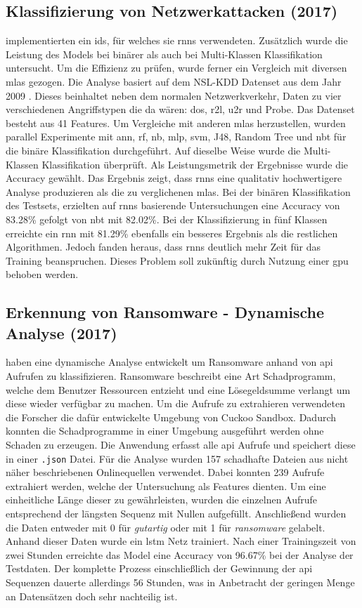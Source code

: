 \documentclass[
    12pt, %
    DIV10,
    ngerman, %
    a4paper, %
    oneside, %
    titlepage, %
    parskip=half, %
    headings=normal, %
    listof=totoc, %
    bibliography=totoc, %
    index=totoc, %
    captions=tableheading, %
    final %
]{scrreprt}
\begin{document}
\subsection{Klassifizierung von Netzwerkattacken (2017)}\label{yin}
\textcite{Yin2017} implementierten ein \ac{ids}, für welches sie \ac{rnns} verwendeten. Zusätzlich wurde die Leistung des Models bei binärer als auch bei Multi-Klassen Klassifikation untersucht. Um die Effizienz zu prüfen, wurde ferner ein Vergleich mit diversen \ac{mlas} gezogen. Die Analyse basiert auf dem NSL-KDD Datenset aus dem Jahr 2009 \parencite{Cybersecurity}. Dieses beinhaltet neben dem normalen Netzwerkverkehr, Daten zu vier verschiedenen Angriffstypen die da wären: \ac{dos}, \ac{r2l}, \ac{u2r} und Probe. Das Datenset besteht aus 41 Features. Um Vergleiche mit anderen \ac{mlas} herzustellen, wurden parallel Experimente mit \ac{ann}, \ac{rf}, \ac{nb}, \ac{mlp}, \ac{svm}, J48, Random Tree und \ac{nbt} für die binäre Klassifikation durchgeführt. Auf dieselbe Weise wurde die Multi-Klassen Klassifikation überprüft. Als Leistungsmetrik der Ergebnisse wurde die Accuracy gewählt. Das Ergebnis zeigt, dass \ac{rnns} eine qualitativ hochwertigere Analyse produzieren als die zu verglichenen \ac{mlas}. Bei der binären Klassifikation des Testsets, erzielten auf \ac{rnns} basierende Untersuchungen eine Accuracy von 83.28\% gefolgt von \ac{nbt} mit 82.02\%. Bei der Klassifizierung in fünf Klassen erreichte ein \ac{rnn} mit 81.29\% ebenfalls ein besseres Ergebnis als die restlichen Algorithmen. Jedoch fanden \textcite{Yin2017} heraus, dass \ac{rnns} deutlich mehr Zeit für das Training beanspruchen. Dieses Problem soll zukünftig durch Nutzung einer \ac{gpu} behoben werden.
%
\subsection{Erkennung von Ransomware - Dynamische Analyse (2017)}
\textcite{Maniath2018} haben eine dynamische Analyse entwickelt um Ransomware anhand von \ac{api} Aufrufen zu klassifizieren. Ransomware beschreibt eine Art Schadprogramm, welche dem Benutzer Ressourcen entzieht und eine Lösegeldsumme verlangt um diese wieder verfügbar zu machen. Um die Aufrufe zu extrahieren verwendeten die Forscher die dafür entwickelte Umgebung von Cuckoo Sandbox. Dadurch konnten die Schadprogramme in einer Umgebung ausgeführt werden ohne Schaden zu erzeugen. Die Anwendung erfasst alle \ac{api} Aufrufe und speichert diese in einer \texttt{.json} Datei. Für die Analyse wurden 157 schadhafte Dateien aus nicht näher beschriebenen Onlinequellen verwendet. Dabei konnten 239 Aufrufe extrahiert werden, welche der Untersuchung als Features dienten. Um eine einheitliche Länge dieser zu gewährleisten, wurden die einzelnen Aufrufe entsprechend der längsten Sequenz mit Nullen aufgefüllt. Anschlie{\ss}end wurden die Daten entweder mit 0 für \emph{gutartig} oder mit 1 für \emph{ransomware} gelabelt. Anhand dieser Daten wurde ein \ac{lstm} Netz trainiert. Nach einer Trainingszeit von zwei Stunden erreichte das Model eine Accuracy von 96.67\% bei der Analyse der Testdaten. Der komplette Prozess einschlie{\ss}lich der Gewinnung der \ac{api} Sequenzen dauerte allerdings 56 Stunden, was in Anbetracht der geringen Menge an Datensätzen doch sehr nachteilig ist.
%
\end{document}
